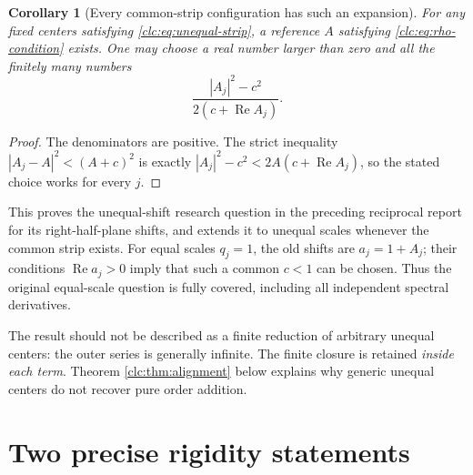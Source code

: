 \documentclass[11pt,a4paper]{article}
\numberwithin{equation}{section}
\newtheorem{corollary}[theorem]{Corollary}
\theoremstyle{definition}\newtheorem{definition}[theorem]{Definition}
\theoremstyle{remark}\newtheorem{remark}[theorem]{Remark}
\DeclareMathOperator{\Rea}{Re}
\begin{document}
\begin{corollary}[Every common-strip configuration has such an expansion]
\label{clc:cor:global-center}
For any fixed centers satisfying \eqref{clc:eq:unequal-strip}, a reference
$A$ satisfying \eqref{clc:eq:rho-condition} exists. One may choose a real
number larger than zero and all the finitely many numbers
\begin{equation}\label{clc:eq:choose-A}
 \frac{|A_j|^2-c^2}{2(c+\Rea A_j)}.
\end{equation}
\end{corollary}
\begin{proof}
The denominators are positive. The strict inequality
$|A_j-A|^2<(A+c)^2$ is exactly
$|A_j|^2-c^2<2A(c+\Rea A_j)$, so the stated choice works for every $j$.
\end{proof}

This proves the unequal-shift research question in the preceding
reciprocal report \cite[Further research, question 2]{RLC} for its
right-half-plane shifts, and extends it to unequal scales whenever the
common strip exists. For equal scales $q_j=1$, the old shifts are
$a_j=1+A_j$; their conditions $\Rea a_j>0$ imply that such a common
$c<1$ can be chosen. Thus the original equal-scale question is fully
covered, including all independent spectral derivatives.

The result should not be described as a finite reduction of arbitrary
unequal centers: the outer series is generally infinite. The finite
closure is retained \emph{inside each term}. Theorem
\ref{clc:thm:alignment} below explains why generic unequal centers do
not recover pure order addition.

\section{Two precise rigidity statements}
\label{clc:sec:rigidity}
\end{document}
